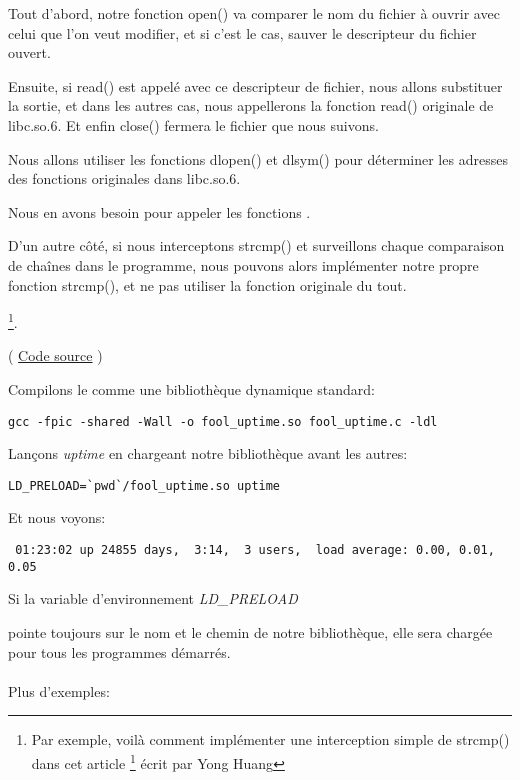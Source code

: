 Tout d'abord, notre fonction open() va comparer le nom du fichier à ouvrir avec celui que l'on veut modifier,
et si c'est le cas, sauver le descripteur du fichier ouvert.

Ensuite, si read() est appelé avec ce descripteur de fichier, nous allons substituer la sortie,
et dans les autres cas, nous appellerons la fonction read() originale de libc.so.6.
Et enfin close() fermera le fichier que nous suivons.


Nous allons utiliser les fonctions dlopen() et dlsym() pour déterminer les adresses des fonctions originales dans libc.so.6.

Nous en avons besoin pour appeler les fonctions .


D'un autre côté, si nous interceptons strcmp() et surveillons chaque comparaison de
chaînes dans le programme, nous pouvons alors implémenter notre propre fonction strcmp(),
et ne pas utiliser la fonction originale du tout.

\footnote{Par exemple, voilà comment implémenter une interception simple de strcmp() dans cet article
\footnote{\href{http://go.yurichev.com/17143}{yurichev.com}}
écrit par Yong Huang}.


( \href{\RepoURL/OS/LD_PRELOAD/fool_uptime.c}{Code source} )

Compilons le comme une bibliothèque dynamique standard:

\begin{lstlisting}
gcc -fpic -shared -Wall -o fool_uptime.so fool_uptime.c -ldl
\end{lstlisting}

Lançons \emph{uptime}
en chargeant notre bibliothèque avant les autres:

\begin{lstlisting}
LD_PRELOAD=`pwd`/fool_uptime.so uptime
\end{lstlisting}

Et nous voyons:

\begin{lstlisting}
 01:23:02 up 24855 days,  3:14,  3 users,  load average: 0.00, 0.01, 0.05
\end{lstlisting}

Si la variable d'environnement \emph{LD\_PRELOAD}

pointe toujours sur le nom et le chemin de notre bibliothèque,
elle sera chargée pour tous les programmes démarrés. \\
\\
Plus d'exemples:

